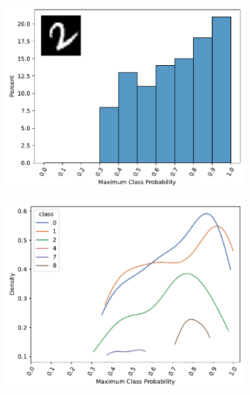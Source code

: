 \begin{figure}[hp]
    \centering
    \begin{subfigure}{0.45\textwidth}
        \includegraphics[width=\textwidth]{MCP_barplot.pdf}
        \caption{}
        \label{fig:MCP:barplot}
    \end{subfigure}%
    \begin{subfigure}{0.45\textwidth}
        \includegraphics[width=\textwidth]{MCP_kdeplot.pdf}
        \caption{}
        \label{fig:MCP:kdeplot}
    \end{subfigure}%
    \caption{}
    \label{fig:MCP}
\end{figure}

